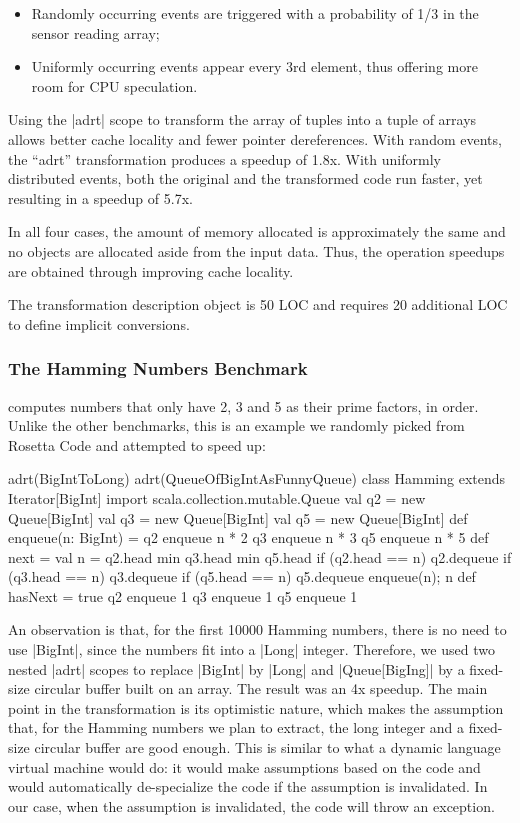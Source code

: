 \begin{itemize}
 \item Randomly occurring events are triggered with a probability of 1/3 in the sensor reading array;
 \item Uniformly occurring events appear every 3rd element, thus offering more room for CPU speculation.
\end{itemize}

Using the |adrt| scope to transform the array of tuples into a tuple of arrays allows better cache locality and fewer pointer dereferences. With random events, the ``adrt'' transformation produces a speedup of 1.8x. With uniformly distributed events, both the original and the transformed code run faster, yet resulting in a speedup of 5.7x.

In all four cases, the amount of memory allocated is approximately the same and no objects are allocated aside from the input data. Thus, the operation speedups are obtained through improving cache locality.

The transformation description object is 50 LOC and requires 20 additional LOC to define implicit conversions.

\subsubsection*{The Hamming Numbers Benchmark} computes numbers that only have 2, 3 and 5 as their prime factors, in order. Unlike the other benchmarks, this is an example we randomly picked from Rosetta Code \cite{rosetta-code} and attempted to speed up:

\begin{lstlisting-nobreak}
adrt(BigIntToLong) {
  adrt(QueueOfBigIntAsFunnyQueue) {
    class Hamming extends Iterator[BigInt] {
      import scala.collection.mutable.Queue
      val q2 = new Queue[BigInt]
      val q3 = new Queue[BigInt]
      val q5 = new Queue[BigInt]
      def enqueue(n: BigInt) = {
        q2 enqueue n * 2
        q3 enqueue n * 3
        q5 enqueue n * 5
      }
      def next = {
        val n = q2.head min q3.head min q5.head
        if (q2.head == n) q2.dequeue
        if (q3.head == n) q3.dequeue
        if (q5.head == n) q5.dequeue
        enqueue(n); n
      }
      def hasNext = true
      q2 enqueue 1
      q3 enqueue 1
      q5 enqueue 1
    }
  }
}
\end{lstlisting-nobreak}

An observation is that, for the first 10000 Hamming numbers, there is no need to use |BigInt|, since the numbers fit into a |Long| integer. Therefore, we used two nested |adrt| scopes to replace |BigInt| by |Long| and |Queue[BigIng]| by a fixed-size circular buffer built on an array. The result was an 4x speedup. The main point in the transformation is its optimistic nature, which makes the assumption that, for the Hamming numbers we plan to extract, the long integer and a fixed-size circular buffer are good enough. This is similar to what a dynamic language virtual machine would do: it would make assumptions based on the code and would automatically de-specialize the code if the assumption is invalidated. In our case, when the assumption is invalidated, the code will throw an exception.

